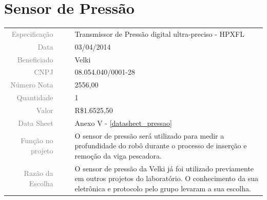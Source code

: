 

\section{Sensor de Pressão}
\label{pressao}


\begin{table}[ht!]

	\begin{tabular}{r l|l p{12cm} }
		
		\textcolor{gray}{Especificação} &&& 	{Transmissor de Pressão digital
		ultra-preciso - HPXFL}\\
		\textcolor{gray}{Data} &&& 				{03/04/2014}\\
        \textcolor{gray}{Beneficiado} &&&		{Velki} \\
        \textcolor{gray}{CNPJ} &&& 				{08.054.040/0001-28} \\
        \textcolor{gray}{Número Nota} &&& 		{2556,00} \\
		\textcolor{gray}{Quantidade} &&& 		{1} \\
		\textcolor{gray}{Valor} &&& 			{R\$1.6525,50} \\
		\textcolor{gray}{Data Sheet} &&& 		{Anexo V - \ref{datasheet_pressao} } \\

		\textcolor{gray}{Função no projeto} &&& {O sensor de pressão será utilizado
		para medir a profundidade do robô durante o processo de inserção e remoção da
		viga pescadora.} \\
		\textcolor{gray}{Razão da Escolha} &&& {O sensor de pressão da Velki já foi
		utilizado previamente em outros projetos do laboratório. O conhecimento da sua
		eletrônica e protocolo pelo grupo levaram a sua escolha.}
		

	\end{tabular}
\end{table}

\newpage
